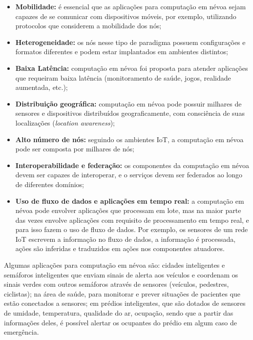 \begin{itemize}

    \item \textbf{Mobilidade:} é essencial que as aplicações para computação em névoa sejam
    capazes de se comunicar com dispositivos móveis, por exemplo, utilizando
    protocolos que considerem a mobilidade dos nós;

    \item \textbf{Heterogeneidade:} os nós nesse tipo de paradigma possuem
    configurações e formatos diferentes e podem estar implantados em ambientes
    distintos;

    \item \textbf{Baixa Latência:} computação em névoa foi proposta para
    atender aplicações que requeiram baixa latência (monitoramento de saúde,
    jogos, realidade aumentada, etc.);

    \item \textbf{Distribuição geográfica:} computação em névoa pode possuir
    milhares de sensores e dispositivos distribuídos geograficamente, com
    consciência de suas localizações (\emph{location awareness});

    \item \textbf{Alto número de nós:} seguindo os ambientes IoT, a computação
    em névoa pode ser composta por milhares de nós;

    \item \textbf{Interoperabilidade e federação:} os componentes da computação
    em névoa devem ser capazes de interoperar, e o serviços devem ser federados
    ao longo de diferentes domínios;

    \item \textbf{Uso de fluxo de dados e aplicações em tempo real:} a
    computação em névoa pode envolver aplicações que processam em lote, mas na
    maior parte das vezes envolve aplicações com requisito de processamento em
    tempo real, e para isso fazem o uso de fluxo de dados. Por exemplo, os
    sensores de um rede IoT escrevem a informação no fluxo de dados, a
    informação é processada, ações são inferidas e traduzidos em
    ações nos componentes atuadores.

\end{itemize}

Algumas aplicações para computação em névoa são:
cidades inteligentes e
semáforos inteligentes que enviam sinais de alerta aos veículos e coordenam os
sinais verdes com outros semáforos através de sensores (veículos, pedestres,
ciclistas);
na área de saúde, para monitorar e prever situações de pacientes que
estão conectados a sensores;
em prédios inteligentes, que são dotados de sensores
de umidade, temperatura, qualidade do ar, ocupação, sendo que a partir das
informações deles, é possível alertar os ocupantes do prédio em algum caso de
emergência.

